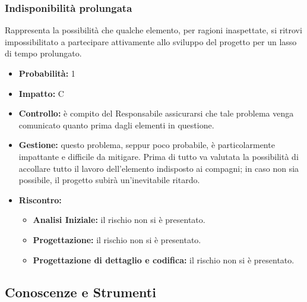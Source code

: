 \documentclass[a4paper,11pt]{article}
\begin{document}
		\subsubsection{Indisponibilità prolungata}
		Rappresenta la possibilità che qualche elemento, per ragioni inaspettate, si ritrovi impossibilitato a partecipare attivamente allo sviluppo del progetto per un lasso di tempo prolungato. 
		\begin{itemize}
		\item \textbf{Probabilità: }1
		\item \textbf{Impatto: }C
		\item \textbf{Controllo:} è compito del Responsabile assicurarsi che tale problema venga comunicato quanto prima dagli elementi in questione.
		\item \textbf{Gestione:} questo problema, seppur poco probabile, è particolarmente impattante e difficile da mitigare. Prima di tutto va valutata la possibilità di accollare tutto il lavoro dell'elemento indisposto ai compagni; in caso non sia possibile, il progetto subirà un'inevitabile ritardo.
		\item \textbf{Riscontro:}
			\begin{itemize}
				\item\textbf{Analisi Iniziale:} il rischio non si è presentato.
				\item\textbf{Progettazione:} il rischio non si è presentato.
				\item\textbf{Progettazione di dettaglio e codifica:} il rischio non si è presentato.
			\end{itemize}
		\end{itemize}
	\subsection{Conoscenze e Strumenti} \label{risk:conoscenze }
\end{document}
